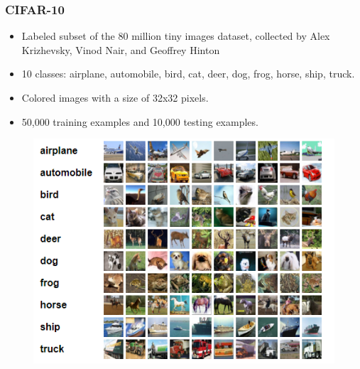 \documentclass{beamer}
\begin{document}
\begin{frame}\frametitle{CIFAR-10}
\begin{itemize}
	\item Labeled subset of the 80 million tiny images dataset, collected by Alex
	Krizhevsky, Vinod Nair, and Geoffrey Hinton 
	\item 10 classes: airplane, automobile, bird, cat, deer, dog, frog, horse, ship, truck.
	\item Colored images with a size of 32x32 pixels.
	\item 50,000 training examples and
	10,000 testing examples.
\end{itemize}
\begin{figure}[h]
	\includegraphics[scale=0.3]{figures/cifar10}
	\centering
	\label{fig:cifar10}
\end{figure}

\end{frame}
\end{document}
